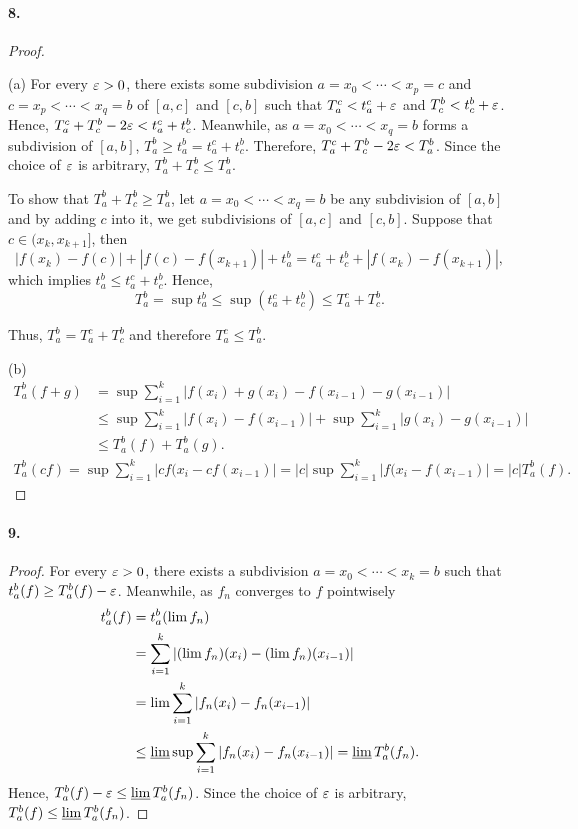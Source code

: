   \paragraph{8.}
  \begin{proof}
    $\,$\par
    (a) For every $\varepsilon>0$, there exists some subdivision $a=x_0<\cdots<x_p=c$ 
    and $c=x_p<\cdots<x_q=b$ of $[a,c]$ and $[c,b]$ such that $T_a^c<t_a^c+\varepsilon$
    and $T_c^b<t_c^b+\varepsilon$. Hence, $T_a^c+T_c^b-2\varepsilon < t_a^c+t_c^b$. Meanwhile,
    as $a=x_0<\cdots<x_q=b$ forms a subdivision of $[a,b]$, $T_a^b\ge t_a^b =
    t_a^c+t_c^b$. Therefore, $T_a^c+T_c^b-2\varepsilon < T_a^b$. Since the choice of
    $\varepsilon$ is arbitrary, $T_a^b+T_c^b\le T_a^b$.\par
    To show that $T_a^b+T_c^b\ge T_a^b$, let $a=x_0<\cdots<x_q=b$ be 
    any subdivision of $[a,b]$ and by adding $c$ into it, we get subdivisions of
    $[a,c]$ and $[c,b]$. Suppose that $c\in(x_k, x_{k+1}]$, then
    \[
      |f(x_k)-f(c)|+|f(c)-f(x_{k+1})|+t_a^b = t_a^c+t_c^b+|f(x_k)-f(x_{k+1})|,
    \]
    which implies $t_a^b\le t_a^c+t_c^b$. Hence, 
    \[
      T_a^b = \sup t_a^b \le \sup(t_a^c+t_c^b) \le T_a^c + T_c^b.
    \]\par
    Thus, $T_a^b=T_a^c+T_c^b$ and therefore $T_a^c\le T_a^b$.\par
    (b) 
    \begin{align*}
      T_a^b(f+g) 
      &=   \sup\sum_{i=1}^k|f(x_i)+g(x_i)-f(x_{i-1})-g(x_{i-1})| \\
      &\le \sup\sum_{i=1}^k|f(x_i)-f(x_{i-1})| + 
           \sup\sum_{i=1}^k|g(x_i)-g(x_{i-1})| \\
      &\le T_a^b(f) + T_a^b(g).
    \end{align*}
    \begin{align*}
      T_a^b(cf) 
      = \sup\sum_{i=1}^k|cf(x_i-cf(x_{i-1})| 
      = |c|\sup\sum_{i=1}^k|f(x_i-f(x_{i-1})| 
      = |c|T_a^b(f).
    \end{align*}
  \end{proof}

  \paragraph{9.}
  \begin{proof}
    For every $\varepsilon>0$, there exists a subdivision $a=x_0<\cdots<x_k=b$ such
    that $t_a^b(f)\ge T_a^b(f)-\varepsilon$. Meanwhile, as $f_n$ converges to $f$
    pointwisely
    \begin{align*}
      t_a^b(f) &= t_a^b(\lim f_n) \\
      &= \sum_{i=1}^k|(\lim f_n)(x_i) - (\lim f_n)(x_{i-1})| \\
      &= \lim \sum_{i=1}^k|f_n(x_i)-f_n(x_{i-1})| \\
      &\le \operatorname*{\underline{lim}}\sup\sum_{i=1}^k|f_n(x_i)-f_n(x_{i-1})| 
      = \operatorname*{\underline{lim}} T_a^b(f_n).
    \end{align*}
    Hence, $T_a^b(f)-\varepsilon \le \operatorname*{\underline{lim}} T_a^b(f_n)$. Since the choice of $\varepsilon$ is
    arbitrary, $T_a^b(f)\le\operatorname*{\underline{lim}} T_a^b(f_n)$.
  \end{proof}


